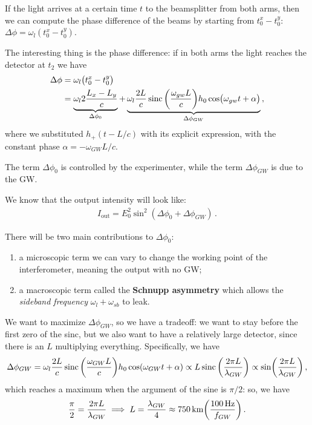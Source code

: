 \documentclass[main.tex]{subfiles}
\begin{document}
If the light arrives at a certain time \(t\) to the beamsplitter from both arms, then we can compute the phase difference of the beams by starting from \(t_0^{x} - t_0^{y}\):  \(\Delta \phi = \omega_{l} (t_0^{x} - t_0^{y})\). 

The interesting thing is the phase difference: if in both arms the light reaches the detector at \(t_2 \) we have 
%
\begin{subequations}
\begin{align}
\Delta \phi 
&= \omega_{l} \qty(t_0^{x }- t_0^{y}) \\
&= \underbrace{\omega_{l} 2 \frac{L_x -L_y}{c}}_{\Delta \phi_0 } + \underbrace{\omega_{l} \frac{2L}{c} \operatorname{sinc} \qty(\frac{\omega_{gw} L}{c} ) h_0 \cos(\omega_{gw} t + \alpha )}_{\Delta \phi_{GW}}
\,,
\end{align}
\end{subequations}
%
where we substituted \(h_{+} (t - L / c)\) with its explicit expression, with the constant phase \(\alpha = - \omega_{GW} L / c\). 

The term \(\Delta \phi_0 \) is controlled by the experimenter, while the term \(\Delta \phi_{GW}\) is due to the GW.

We know that the output intensity will look like: 
%
\begin{align}
I _{\text{out}} = E_0^2 \sin^2 (\Delta \phi_0 + \Delta \phi_{GW})
\,.
\end{align}

There will be two main contributions to \(\Delta \phi_0 \): 
\begin{enumerate}
    \item a microscopic term we can vary to change the working point of the interferometer, meaning the output with no GW;
    \item a macroscopic term called the \textbf{Schnupp asymmetry} which allows the \emph{sideband frequency} \(\omega_{l} + \omega_{sb}\) to leak.
\end{enumerate}

We want to maximize \(\Delta \phi_{GW}\), so we have a tradeoff: we want to stay before the first zero of the sinc, but we also want to have a relatively large detector, since there is an \(L\) multiplying everything. Specifically, we have 
%
\begin{align}
\Delta \phi_{GW} = \omega_{l} \frac{2L}{c} \operatorname{sinc} \qty(\frac{\omega_{GW}L}{c}) h_0 \cos(\omega_{GW} t + \alpha )
\propto L \operatorname{sinc} \qty( \frac{2 \pi L}{\lambda_{GW}})
\propto \sin(\frac{2 \pi L}{\lambda_{GW}})
\,,
\end{align}
%
which reaches a maximum when the argument of the sine is \(\pi /2\): so, we have 
%
\begin{align}
\frac{\pi}{2} = \frac{2 \pi L}{\lambda_{GW}} \implies L = \frac{\lambda_{GW}}{4} \approx \SI{750}{km} \qty(\frac{\SI{100}{Hz}}{f_{GW}})
\,.
\end{align}
\end{document}
